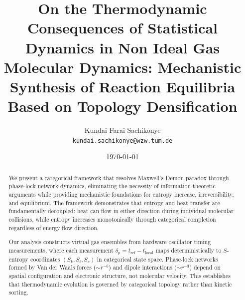 \documentclass[12pt,a4paper]{article}
\title{\textbf{On the Thermodynamic Consequences of Statistical Dynamics in Non Ideal Gas Molecular Dynamics: Mechanistic Synthesis of Reaction Equilibria Based on Topology Densification }}
\author{Kundai Farai Sachikonye\\
\texttt{kundai.sachikonye@wzw.tum.de}}
\date{\today}
\theoremstyle{definition}
\theoremstyle{remark}
\begin{document}
\maketitle

\begin{abstract}
  We present a categorical framework that resolves Maxwell's Demon paradox through phase-lock network dynamics, eliminating the necessity of information-theoretic arguments while providing mechanistic foundations for entropy increase, irreversibility, and equilibrium. The framework demonstrates that entropy and heat transfer are fundamentally decoupled: heat can flow in either direction during individual molecular collisions, while entropy increases monotonically through categorical completion regardless of energy flow direction.

  Our analysis constructs virtual gas ensembles from hardware oscillator timing measurements, where each measurement $\delta_p = t_{\text{ref}} - t_{\text{local}}$ maps deterministically to $S$-entropy coordinates $(S_k, S_t, S_e)$ in categorical state space. Phase-lock networks formed by Van der Waals forces ($\sim r^{-6}$) and dipole interactions ($\sim r^{-3}$) depend on spatial configuration and electronic structure, not molecular velocity. This establishes that thermodynamic evolution is governed by categorical topology rather than kinetic sorting.


\end{abstract}
\end{document}
